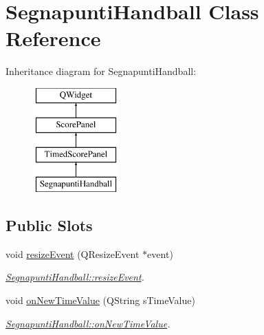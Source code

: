 \hypertarget{classSegnapuntiHandball}{}\section{Segnapunti\+Handball Class Reference}
\label{classSegnapuntiHandball}
Inheritance diagram for Segnapunti\+Handball\+:\begin{figure}[H]
\begin{center}
\leavevmode
\includegraphics[height=4.000000cm]{d8/d8a/classSegnapuntiHandball}
\end{center}
\end{figure}
\subsection*{Public Slots}
\begin{DoxyCompactItemize}
\item 
void \mbox{\hyperlink{classSegnapuntiHandball_ab5f75180cb963fdc1d19899735affde9}{resize\+Event}} (Q\+Resize\+Event $\ast$event)
\begin{DoxyCompactList}\small\item\em \mbox{\hyperlink{classSegnapuntiHandball_ab5f75180cb963fdc1d19899735affde9}{Segnapunti\+Handball\+::resize\+Event}}. \end{DoxyCompactList}\item 
void \mbox{\hyperlink{classSegnapuntiHandball_aba98f1f92c4eb20e1abf74d35dbefd98}{on\+New\+Time\+Value}} (Q\+String s\+Time\+Value)
\begin{DoxyCompactList}\small\item\em \mbox{\hyperlink{classSegnapuntiHandball_aba98f1f92c4eb20e1abf74d35dbefd98}{Segnapunti\+Handball\+::on\+New\+Time\+Value}}. \end{DoxyCompactList}\end{DoxyCompactItemize}
